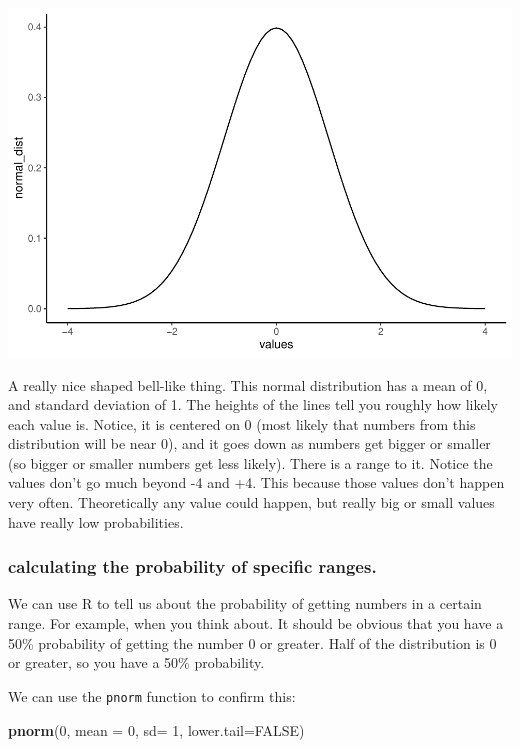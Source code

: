 \documentclass[]{book}
\newenvironment{Shaded}{\begin{snugshade}}{\end{snugshade}}
\newcommand{\KeywordTok}[1]{\textcolor[rgb]{0.13,0.29,0.53}{\textbf{#1}}}
\newcommand{\DataTypeTok}[1]{\textcolor[rgb]{0.13,0.29,0.53}{#1}}
\newcommand{\DecValTok}[1]{\textcolor[rgb]{0.00,0.00,0.81}{#1}}
\newcommand{\OtherTok}[1]{\textcolor[rgb]{0.56,0.35,0.01}{#1}}
\newcommand{\NormalTok}[1]{#1}
\begin{document}
\includegraphics{Statistics_Lab_files/figure-latex/unnamed-chunk-124-1.pdf}

A really nice shaped bell-like thing. This normal distribution has a
mean of 0, and standard deviation of 1. The heights of the lines tell
you roughly how likely each value is. Notice, it is centered on 0 (most
likely that numbers from this distribution will be near 0), and it goes
down as numbers get bigger or smaller (so bigger or smaller numbers get
less likely). There is a range to it. Notice the values don't go much
beyond -4 and +4. This because those values don't happen very often.
Theoretically any value could happen, but really big or small values
have really low probabilities.

\subsubsection{calculating the probability of specific
ranges.}\label{calculating-the-probability-of-specific-ranges.}

We can use R to tell us about the probability of getting numbers in a
certain range. For example, when you think about. It should be obvious
that you have a 50\% probability of getting the number 0 or greater.
Half of the distribution is 0 or greater, so you have a 50\%
probability.

We can use the \texttt{pnorm} function to confirm this:

\begin{Shaded}
\begin{Highlighting}[]
\KeywordTok{pnorm}\NormalTok{(}\DecValTok{0}\NormalTok{, }\DataTypeTok{mean =} \DecValTok{0}\NormalTok{, }\DataTypeTok{sd=} \DecValTok{1}\NormalTok{, }\DataTypeTok{lower.tail=}\OtherTok{FALSE}\NormalTok{)}
\end{Highlighting}
\end{Shaded}
\end{document}
